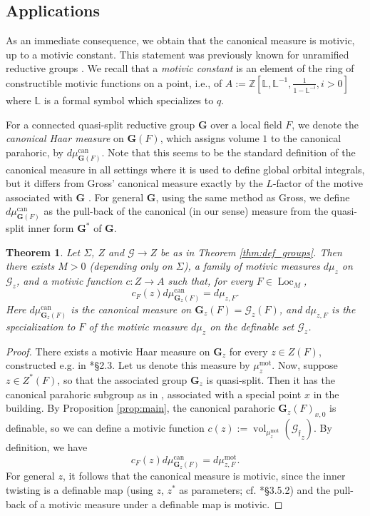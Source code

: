 \documentclass{amsart}
\newcommand{\Z}{{\mathbb Z}}
\newcommand{\cG}{\mathcal{G}}
\DeclareMathOperator{\vol}{vol}
\DeclareMathOperator{\loc}{Loc}
\newcommand{\bG}{\mathbf{G}}
\newcommand{\can}{\mathrm{can}}
\newcommand{\ff}{{\mathfrak f}}
\newcommand\lef{\mathbb L}
\newcommand\mot{\mathrm{mot}}
\theoremstyle{plain}
\newtheorem{theorem}[thm]{Theorem}
\theoremstyle{definition}
\begin{document}
\subsection{Applications} 
As an immediate consequence, we obtain that the canonical measure is motivic, up to a motivic constant.
This statement was previously known for unramified reductive groups \cite{cluckers-hales-loeser}.
We recall that a \emph{motivic constant} is an element of the ring of constructible motivic functions on a point,
i.e., of $A:=\Z[\lef, \lef^{-1}, \frac{1}{1-\lef^{-i}}, i>0]$ where $\lef$ is a formal symbol which specializes to $q$.

For a connected quasi-split reductive group $\bG$ over a local field $F$, we denote the \emph{canonical Haar measure}
on $\bG(F)$, which assigns volume $1$ to the canonical parahoric, by $d\mu_{\bG(F)}^\can$. 
Note that this seems to be the standard definition of the canonical measure in all settings
where it is used to define global orbital integrals, but it differs from Gross' canonical measure
exactly by the $L$-factor of the motive associated with $\bG$ \cite{gross:97a}.  For general $\bG$, using the same method as Gross, 
we define $d\mu_{\bG(F)}^\can$ as the pull-back of the canonical (in our sense) measure from the quasi-split inner form $\bG^\ast$ of $\bG$.  

\begin{theorem}\label{thm:mot_meas}
 Let $\Sigma$, $Z$  and $\cG \to Z$ be as in Theorem \ref{thm:def_groups}. 
Then there exists $M>0$ (depending only on $\Sigma$), a family of  motivic measures
$d\mu_z$ on $\cG_z$, and a motivic function $c:Z\to A$ such that, for every $F\in \loc_M$,
\[
c_F(z) d\mu_{\bG_z(F)}^\can = d\mu_{z, F}.
\]
Here $d\mu_{\bG_z(F)}^\can$ is the canonical measure on $\bG_z(F)=\cG_z(F)$,
and $d\mu_{z, F}$ is the specialization to $F$ of the motivic measure $d\mu_z$ on the definable set $\cG_z$. 
\end{theorem} 

\begin{proof} There exists a motivic Haar measure on $\bG_z$ for every $z\in Z(F)$,
constructed e.g. in \cite{gordon-hales:15a}*{\S 2.3}. Let us denote this measure by $\mu_z^\mot$. Now, suppose 
$z\in Z^\ast(F)$, so that the associated group $\bG_z$ is quasi-split.  
Then it has the canonical parahoric subgroup as in \cite{gross:97a}, associated with a special point $x$ in the building. 
By Proposition \ref{prop:main}, the canonical parahoric $\bG_z(F)_{x, 0}$ is definable, so we can define  a motivic function $c(z):=\vol_{\mu_z^\mot}({\cG_{\ff}}_z)$. 
By definition, we have 
\[
c_F(z) d\mu_{\bG_z(F)}^\can = d\mu_{z, F}^\mot.
\]
For general $z$, it follows that the canonical measure is motivic, since the inner twisting is a definable map
(using $z$, $z^\ast$ as parameters; cf. \cite{cluckers-gordon-halupczok:14b}*{\S 3.5.2}) and the pull-back of a motivic measure under a definable map is motivic.
\end{proof}
\end{document}
